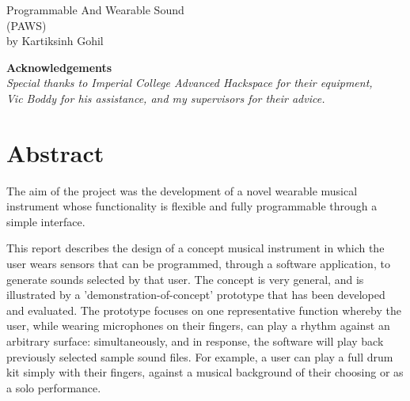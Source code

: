 \thispagestyle{empty}

\begin{tabular}{|l}

\end{tabular}


\vspace{150 pt}
\begin{center}
\huge Programmable And Wearable Sound\\
\LARGE  (PAWS)\\
\bigskip
\LARGE by Kartiksinh Gohil

\end{center}

\vspace{100 pt}
\begin{center}
\textbf{Acknowledgements}\\
\textit{Special thanks to Imperial College Advanced Hackspace for their equipment,\\Vic Boddy for his assistance, and my supervisors for their advice.}\\

\end{center}

\vfill
\normalsize
\section*{Abstract} \label{Project Specification}

The aim of the project was the development of a novel wearable musical instrument whose functionality is flexible and fully programmable through a simple interface.

This report describes the design of a concept musical instrument in which the user wears sensors that can be programmed, through a software application, to generate sounds selected by that user. The concept is very general, and is illustrated by a 'demonstration-of-concept' prototype that has been developed and evaluated.  The prototype focuses on one representative function whereby the user, while wearing microphones on their fingers, can play a rhythm against an arbitrary surface: simultaneously, and in response, the software will play back previously selected sample sound files. For example, a user can play a full drum kit simply with their fingers, against a musical background of their choosing or as a solo performance.

